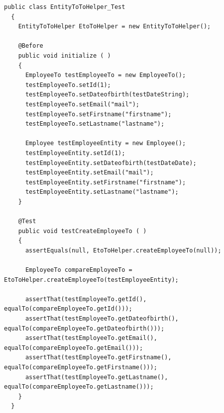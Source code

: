\begin{minipage}{\linewidth}
  \begin{lstlisting}[style=lstJava]
  public class EntityToToHelper_Test
  {
    EntityToToHelper EtoToHelper = new EntityToToHelper();

    @Before
    public void initialize ( )
    {
      EmployeeTo testEmployeeTo = new EmployeeTo();
      testEmployeeTo.setId(1);
      testEmployeeTo.setDateofbirth(testDateString);
      testEmployeeTo.setEmail("mail");
      testEmployeeTo.setFirstname("firstname");
      testEmployeeTo.setLastname("lastname");

      Employee testEmployeeEntity = new Employee();
      testEmployeeEntity.setId(1);
      testEmployeeEntity.setDateofbirth(testDateDate);
      testEmployeeEntity.setEmail("mail");
      testEmployeeEntity.setFirstname("firstname");
      testEmployeeEntity.setLastname("lastname");
    }

    @Test
    public void testCreateEmployeeTo ( )
    {
      assertEquals(null, EtoToHelper.createEmployeeTo(null));

      EmployeeTo compareEmployeeTo = EtoToHelper.createEmployeeTo(testEmployeeEntity);

      assertThat(testEmployeeTo.getId(), equalTo(compareEmployeeTo.getId()));
      assertThat(testEmployeeTo.getDateofbirth(), equalTo(compareEmployeeTo.getDateofbirth()));
      assertThat(testEmployeeTo.getEmail(), equalTo(compareEmployeeTo.getEmail()));
      assertThat(testEmployeeTo.getFirstname(), equalTo(compareEmployeeTo.getFirstname()));
      assertThat(testEmployeeTo.getLastname(), equalTo(compareEmployeeTo.getLastname()));
    }
  }

	\end{lstlisting}
  \label{src:entitytotohelpertest}
\end{minipage}